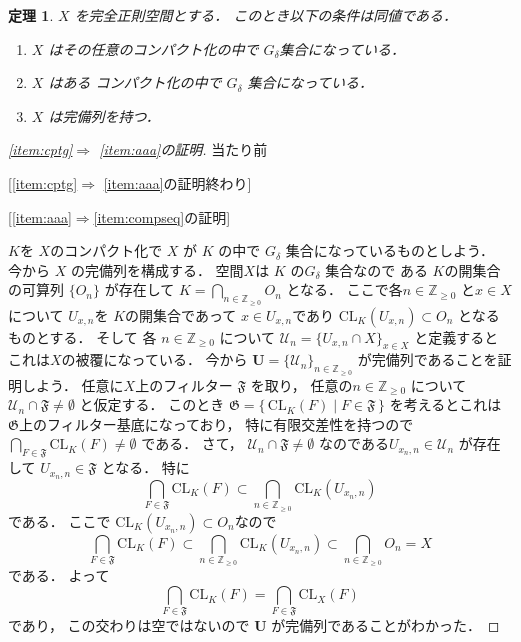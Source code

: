 \documentclass[leqno, a4paper, 12pt]{jsarticle}
\newtheorem{thm}{定理}
\newcommand{\To}{\Longrightarrow}
\newcommand{\zz}{\mathbb{Z}}
\newcommand{\cl}{\mathrm{CL}}
\begin{document}
\begin{thm}\label{thm:frolik}
$X$
を完全正則空間とする．
このとき以下の条件は同値である．
\begin{enumerate}[label=\textup{(\arabic*)}]
\item\label{item:cptg}
$X$
はその任意のコンパクト化の中で
$G_{\delta}$集合になっている．

\item\label{item:aaa}
$X$
はある
コンパクト化の中で
$G_{\delta}$
集合になっている．

\item\label{item:compseq}
$X$
は完備列を持つ．
\end{enumerate}
\end{thm}
\begin{proof}
[\ref{item:cptg}$\To$ \ref{item:aaa}の証明]

当たり前

[\ref{item:cptg}$\To$ \ref{item:aaa}の証明終わり]

[\ref{item:aaa}$\To$\ref{item:compseq}の証明]

$K$を
$X$のコンパクト化で
$X$
が
$K$
の中で
$G_{\delta}$
集合になっているものとしよう．
今から
$X$
の完備列を構成する．
空間$X$は
$K$
の$G_{\delta}$
集合なので
ある
$K$の開集合の可算列
$\{O_{n}\}$
が存在して
$K=\bigcap_{n\in \zz_{\ge 0}}O_{n}$
となる．
ここで各$n\in \zz_{\ge 0}$
と$x\in X$
について
$U_{x, n}$を
$K$の開集合であって
$x\in U_{x, n}$であり
$\cl_{K}(U_{x, n})\subset O_{n}$
となるものとする．
そして
各
$n\in \zz_{\ge 0}$
について
$\mathcal{U}_{n}=\{U_{x, n}\cap X\}_{x\in X}$
と定義すると
これは$X$の被覆になっている．
今から
$\mathbf{U}=\{\mathcal{U}_{n}\}_{n\in \zz_{\ge 0}}$
が完備列であることを証明しよう．
任意に$X$上のフィルター
$\mathfrak{F}$
を取り，
任意の$n\in \zz_{\ge 0}$
について
$\mathcal{U}_{n}\cap \mathfrak{F}\neq \emptyset$
と仮定する．
このとき
$\mathfrak{G}=\{\, \cl_{K}(F)\mid F\in \mathfrak{F}\, \}$
を考えるとこれは
$\mathfrak{G}$上のフィルター基底になっており，
特に有限交差性を持つので
$\bigcap_{F\in \mathfrak{F}}\cl_{K}(F)\neq \emptyset$
である．
さて，
$\mathcal{U}_{n}\cap \mathfrak{F}\neq \emptyset$
なのである$U_{x_{n}, n}\in \mathcal{U}_{n}$
が存在して
$U_{x_{n}, n}\in \mathfrak{F}$
となる．
特に
\[
\bigcap_{F\in \mathfrak{F}}\cl_{K}(F)\subset 
\bigcap_{n\in \zz_{\ge 0}}\cl_{K}(U_{x_{n}, n})
\]
である．
ここで
$\cl_{K}(U_{x_{n}, n})\subset O_{n}$なので
\[
\bigcap_{F\in \mathfrak{F}}\cl_{K}(F)\subset 
\bigcap_{n\in \zz_{\ge 0}}\cl_{K}(U_{x_{n}, n})
\subset \bigcap_{n\in \zz_{\ge 0}}O_{n}=X
\]
である．
よって
\[
\bigcap_{F\in \mathfrak{F}}\cl_{K}(F)
=\bigcap_{F\in \mathfrak{F}}\cl_{X}(F)
\]
であり，
この交わりは空ではないので
$\mathbf{U}$
が完備列であることがわかった．


\end{proof}
\end{document}
